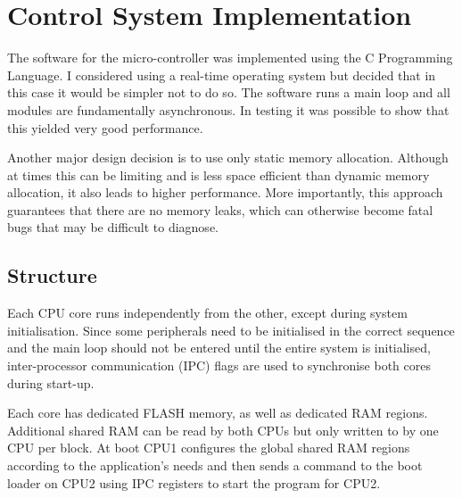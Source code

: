 
\chapter{Control System Implementation}

The software for the micro-controller was implemented using the C Programming Language. I considered using a real-time operating system but decided that in this case it would be simpler not to do so. The software runs a main loop and all modules are fundamentally asynchronous. In testing it was possible to show that this yielded very good performance.

Another major design decision is to use only static memory allocation. Although at times this can be limiting and is less space efficient than dynamic memory allocation, it also leads to higher performance. More importantly, this approach guarantees that there are no memory leaks, which can otherwise become fatal bugs that may be difficult to diagnose.

\section{Structure}

Each CPU core runs independently from the other, except during system initialisation. Since some peripherals need to be initialised in the correct sequence and the main loop should not be entered until the entire system is initialised, inter-processor communication (IPC) flags are used to synchronise both cores during start-up.

Each core has dedicated FLASH memory, as well as dedicated RAM regions. Additional shared RAM can be read by both CPUs but only written to by one CPU per block. At boot CPU1 configures the global shared RAM regions according to the application's needs and then sends a command to the boot loader on CPU2 using IPC registers to start the program for CPU2.

